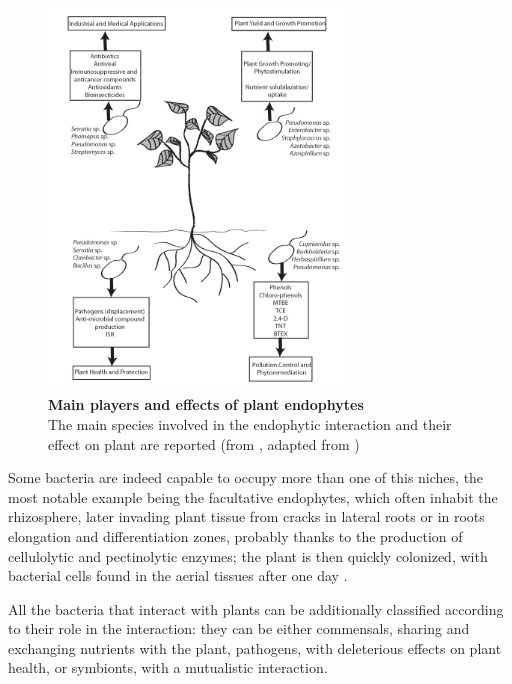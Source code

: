 \begin{figure}[!t]
	\center
    \includegraphics[width=0.7\textwidth]{figures/Introduction/thesis_14}
	\caption{\label{fig:plantendophytes}\textbf{Main players and effects of plant endophytes}\\
			The main species involved in the endophytic interaction and their effect on plant are reported (from \cite{mengoni2011bacterial}, adapted from \cite{ryan2007bacterial})}
\end{figure}

Some bacteria are indeed capable to occupy more than one of this niches, the most notable example being the facultative endophytes, which often inhabit the rhizosphere, later invading plant tissue from cracks in lateral roots or in roots elongation and differentiation zones, probably thanks to the production of cellulolytic and pectinolytic enzymes; the plant is then quickly colonized, with bacterial cells found in the aerial  tissues after one day \cite{rosenblueth2006bacterial}\cite{hallmann1997bacterial}.

All the bacteria that interact with plants can be additionally classified according to their role in the interaction: they can be either commensals, sharing and exchanging nutrients with the plant, pathogens, with deleterious effects on plant health, or symbionts, with a mutualistic interaction.

